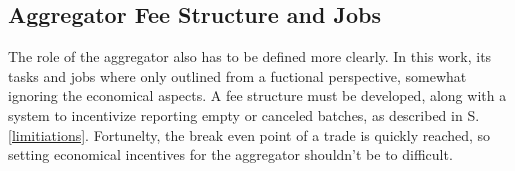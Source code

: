\documentclass[../../thesis.tex]{subfiles}
\begin{document}
\subsection{Aggregator Fee Structure and Jobs}
The role of the aggregator also has to be defined more clearly. In this work, its tasks and jobs where only outlined from a fuctional perspective, somewhat ignoring the economical aspects. A fee structure must be developed, along with a system to incentivize reporting empty or canceled batches, as described in S. \ref{limitiations}. Fortunelty, the break even point of a trade is quickly reached, so setting economical incentives for the aggregator shouldn't be to difficult.
\end{document}

